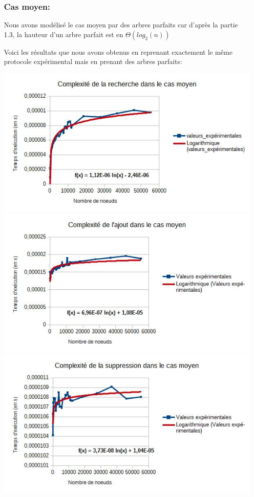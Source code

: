 \documentclass{report}
\begin{document}
\subsubsection{Cas moyen:}
Nous avons modélisé le cas moyen par des arbres parfaits car d'après la partie 1.3, la hauteur d'un arbre parfait est en $\Theta(log_2(n))$ 

Voici les résultats que nous avons obtenus en reprenant exactement le même protocole expérimental mais en prenant des arbres parfaits: 

\includegraphics[scale=0.75]{images/rech2.jpg} \\
\includegraphics[scale=0.75]{images/ajout2.jpg} \\
\includegraphics[scale=0.75]{images/supp2.jpg}
\end{document}

